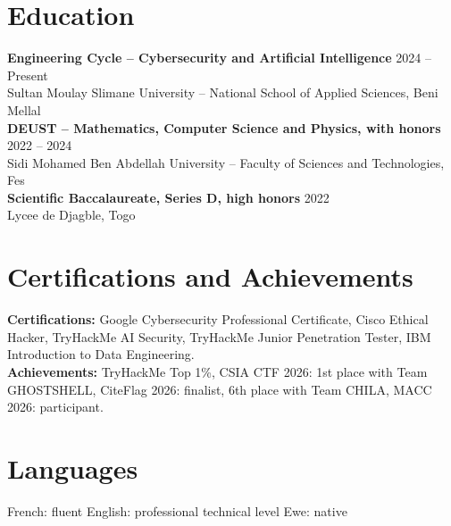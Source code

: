 \documentclass[10pt,a4paper]{article}
\begin{document}
\section{Education}
\textbf{Engineering Cycle -- Cybersecurity and Artificial Intelligence} \hfill 2024 -- Present\\
Sultan Moulay Slimane University -- National School of Applied Sciences, Beni Mellal\\
\textbf{DEUST -- Mathematics, Computer Science and Physics, with honors} \hfill 2022 -- 2024\\
Sidi Mohamed Ben Abdellah University -- Faculty of Sciences and Technologies, Fes\\
\textbf{Scientific Baccalaureate, Series D, high honors} \hfill 2022\\
Lycee de Djagble, Togo

\section{Certifications and Achievements}
\textbf{Certifications:} Google Cybersecurity Professional Certificate, Cisco Ethical Hacker, TryHackMe AI Security, TryHackMe Junior Penetration Tester, IBM Introduction to Data Engineering.\\
\textbf{Achievements:} TryHackMe Top 1\%, CSIA CTF 2026: 1st place with Team GHOSTSHELL, CiteFlag 2026: finalist, 6th place with Team CHILA, MACC 2026: participant.

\section{Languages}
French: fluent \textbar{} English: professional technical level \textbar{} Ewe: native
\end{document}
